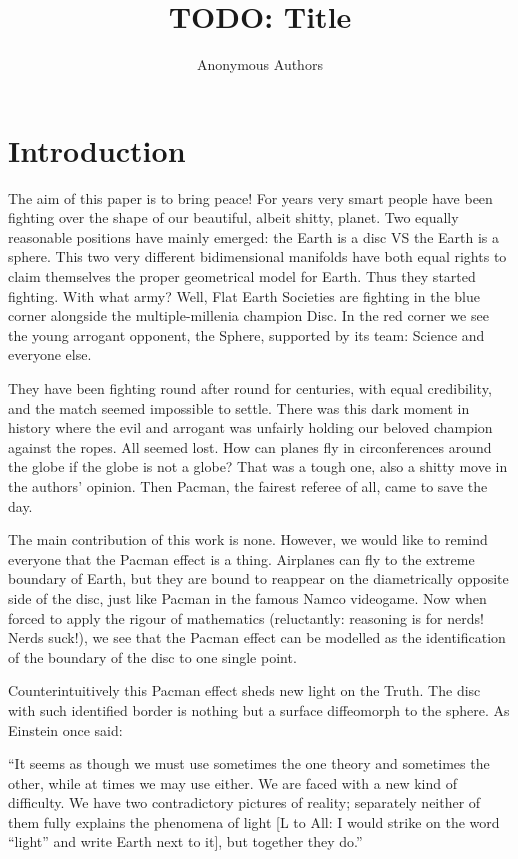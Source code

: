 \documentclass{article}
\title{TODO: Title}
\author{Anonymous Authors}
\date{}
\begin{document}
\maketitle

\section{Introduction}

The aim of this paper is to bring peace! For years very smart people have been
fighting over the shape of our beautiful, albeit shitty, planet. Two equally
reasonable positions have mainly emerged: the Earth is a disc VS the Earth is a
sphere. This two very different bidimensional manifolds have both equal rights
to claim themselves the proper geometrical model for Earth. Thus they started
fighting. With what army? Well, Flat Earth Societies are fighting in the blue
corner alongside the multiple-millenia champion Disc. In the red corner we see
the young arrogant opponent, the Sphere, supported by its team: Science and
everyone else.

They have been fighting round after round for centuries, with equal
credibility, and the match seemed impossible to settle. There was this dark
moment in history where the evil and arrogant was unfairly holding our beloved
champion against the ropes. All seemed lost. How can planes fly in
circonferences around the globe if the globe is not a globe? That was a tough
one, also a shitty move in the authors' opinion. Then Pacman, the fairest
referee of all, came to save the day.

The main contribution of this work is none. However, we would like to remind
everyone that the Pacman effect is a thing. Airplanes can fly to the extreme
boundary of Earth, but they are bound to reappear on the diametrically opposite
side of the disc, just like Pacman in the famous Namco videogame. Now when
forced to apply the rigour of mathematics (reluctantly: reasoning is for nerds!
Nerds suck!), we see that the Pacman effect can be modelled as the
identification of the boundary of the disc to one single point.

Counterintuitively this Pacman effect sheds new light on the Truth. The disc
with such identified border is nothing but a surface diffeomorph to the sphere.
As Einstein once said:

``It seems as though we must use sometimes the one theory and sometimes the
other, while at times we may use either. We are faced with a new kind of
difficulty. We have two contradictory pictures of reality; separately neither
of them fully explains the phenomena of light [L to All: I would strike on the
word ``light'' and write Earth next to it], but together they do.''
\end{document}
